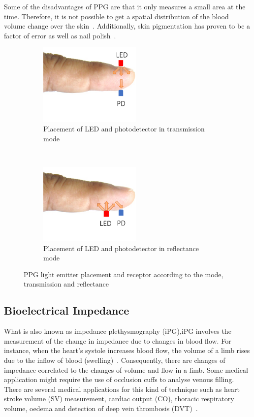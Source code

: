 Some of the disadvantages of PPG are that it only measures a small area at the time. Therefore, it is not possible to get a spatial distribution of the blood volume change over the skin~\cite{wu2003ppgi}. Additionally, skin pigmentation has proven to be a factor of error as well as nail polish~\cite{fallow2013influence}. 

\begin{figure}[!htbp]
	\centering
	\begin{subfigure}[t]{0.45\textwidth}
		\centering
		\includegraphics[height=4cm]{figure7a}
		\caption{Placement of LED and photodetector in transmission mode}
		\label{fig:PPG transmission}
	\end{subfigure}%
	~ 
	\begin{subfigure}[t]{0.45\textwidth}
		\centering
		\includegraphics[height=4cm]{figure7b}
		\caption{Placement of LED and photodetector in reflectance mode}
		\label{fig:PPG reflectance}
	\end{subfigure}
	\caption[PPG sensors placemens as transmission and reflectance modes]{PPG light emitter placement and receptor according to the mode, transmission and reflectance}
	\label{fig:PPG modes}
\end{figure}

\subsection{Bioelectrical Impedance}
\label{section literature 3.5}
What is also known as impedance plethysmography (iPG),iPG involves the measurement of the change in impedance due to changes in blood flow. For instance, when the heart’s systole increases blood flow, the volume of a limb rises due to the inflow of blood (swelling)~\cite{martinsen2011bioimpedance}. Consequently, there are changes of impedance correlated to the changes of volume and flow in a limb. Some medical application might require the use of occlusion cuffs to analyse venous filling. There are several medical applications for this kind of technique such as heart stroke volume (SV) measurement, cardiac output (CO), thoracic respiratory volume, oedema and detection of deep vein thrombosis (DVT)~\cite{holohan1996plethysmography}.

